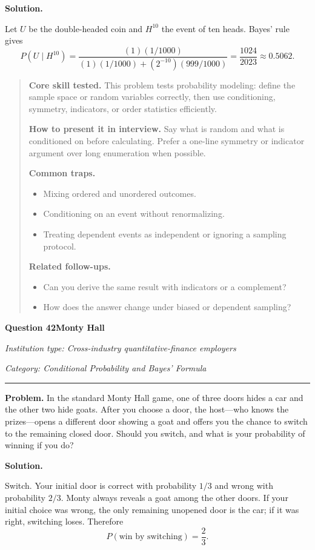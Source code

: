\documentclass[11pt,letterpaper,openany]{book}
\newenvironment{EditorialNote}
  {\begin{quote}\small\setlength{\parskip}{0.25em}}
  {\end{quote}}
\newcommand{\QuestionSpacer}{\vspace{0.4em}}
\newcommand{\FoundationQuestionHeader}[3]{%
  \vspace{1.0em}%
  {\large\bfseries #1\enspace #2\par}%
  {\small\itshape Institution type: Cross-industry quantitative-finance employers\par}%
  {\small\itshape Category: #3\par}%
  \vspace{0.25em}\hrule\vspace{0.45em}%
}
\begin{document}
\textbf{Solution.}

Let \(U\) be the double-headed coin and \(H^{10}\) the event of ten heads. Bayes' rule gives
\[
P(U\mid H^{10})
=\frac{(1)(1/1000)}{(1)(1/1000)+(2^{-10})(999/1000)}
=\boxed{\frac{1024}{2023}}\approx0.5062.
\]


\begin{EditorialNote}


\textbf{Core skill tested.} This problem tests probability modeling: define the sample space or random variables correctly, then use conditioning, symmetry, indicators, or order statistics efficiently.


\textbf{How to present it in interview.} Say what is random and what is conditioned on before calculating. Prefer a one-line symmetry or indicator argument over long enumeration when possible.


\textbf{Common traps.}
\begin{itemize}
\item Mixing ordered and unordered outcomes.
\item Conditioning on an event without renormalizing.
\item Treating dependent events as independent or ignoring a sampling protocol.
\end{itemize}


\textbf{Related follow-ups.}
\begin{itemize}
\item Can you derive the same result with indicators or a complement?
\item How does the answer change under biased or dependent sampling?
\end{itemize}


\end{EditorialNote}
\QuestionSpacer

\FoundationQuestionHeader{Question 42}{Monty Hall}{Conditional Probability and Bayes' Formula}

\textbf{Problem.} In the standard Monty Hall game, one of three doors hides a car and the other two hide goats. After you choose a door, the host---who knows the prizes---opens a different door showing a goat and offers you the chance to switch to the remaining closed door. Should you switch, and what is your probability of winning if you do?


\textbf{Solution.}

Switch. Your initial door is correct with probability \(1/3\) and wrong with probability \(2/3\). Monty always reveals a goat among the other doors. If your initial choice was wrong, the only remaining unopened door is the car; if it was right, switching loses. Therefore
\[
\boxed{P(\text{win by switching})=\frac23}.
\]
\end{document}
